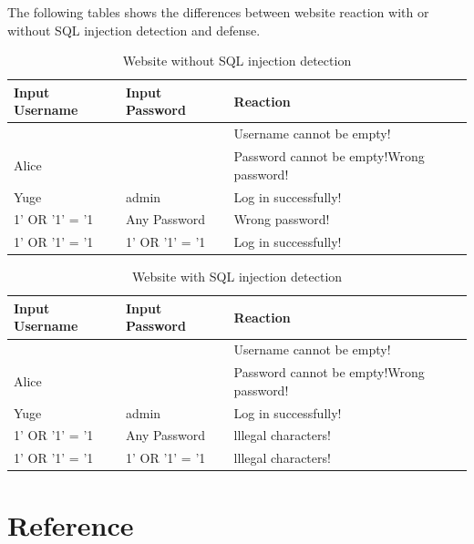 \documentclass[12pt]{article}
\begin{document}
The following tables shows the differences between website reaction with or without SQL injection detection and defense.

\begin{table}[htbp]
\centering
\caption{Website without SQL injection detection}
\begin{tabular}{ l l   p{9cm}  }
\hline
  Input Username & Input Password & Reaction \\
  \hline
   & & Username cannot be empty! \\
  Alice & &Password cannot be empty!Wrong password!  \\
  Yuge & admin & Log in successfully! \\
  1' OR '1' = '1 & Any Password & Wrong password! \\
  1' OR '1' = '1 & 1' OR '1' = '1 & Log in successfully! \\ 
    \hline
\end{tabular}
\end{table}

\begin{table}[htbp]
\centering
\caption{Website with SQL injection detection}
\begin{tabular}{ l l   p{9cm}  }
\hline
  Input Username & Input Password & Reaction \\
  \hline
   & & Username cannot be empty! \\
  Alice & &Password cannot be empty!Wrong password!  \\
  Yuge & admin & Log in successfully! \\
  1' OR '1' = '1 & Any Password & lllegal characters! \\
  1' OR '1' = '1 & 1' OR '1' = '1 & lllegal characters! \\ 
    \hline
\end{tabular}
\end{table}

\newpage
\section{Reference}
\end{document}
